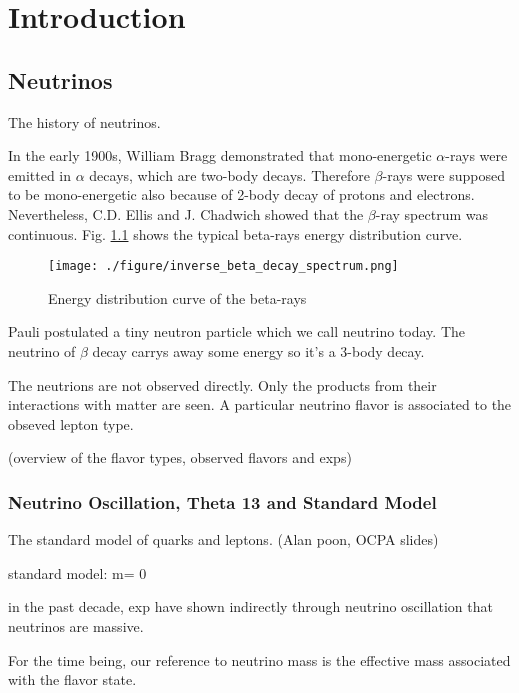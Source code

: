 
\chapter{Introduction}

\section{Neutrinos}

The history of neutrinos.

In the early 1900s, William Bragg demonstrated that mono-energetic $\alpha$-rays
were emitted in $\alpha$ decays, which are two-body decays. Therefore $\beta$-rays
were supposed to be mono-energetic also because of 2-body decay of protons and
electrons. Nevertheless, C.D. Ellis and J. Chadwich showed that the $\beta$-ray
spectrum was continuous. Fig. \ref{fig:inverse_beta_decay_spectrum.png} shows the typical beta-rays energy distribution curve.


\begin{figure}
    \centering
    \texttt{[image: ./figure/inverse\_beta\_decay\_spectrum.png]}
    \caption{Energy distribution curve of the beta-rays\cite{Scott:1935}}
    \label{fig:inverse_beta_decay_spectrum.png}
    \end{figure}


Pauli postulated a tiny neutron particle which we call neutrino today. The neutrino
of $\beta$ decay carrys away some energy so it's a 3-body decay.

The neutrions are not observed directly. Only the products from their interactions
with matter are seen. A particular neutrino flavor is associated to the obseved lepton type.


(overview of the flavor types, observed flavors and exps)




\subsection{Neutrino Oscillation, Theta 13 and Standard Model}

The standard model of quarks and leptons. (Alan poon, OCPA slides)


standard model: m= 0

in the past decade, exp have shown indirectly through neutrino oscillation 
that neutrinos are massive.

For the time being, our reference to neutrino mass is the effective mass
associated with the flavor state.

